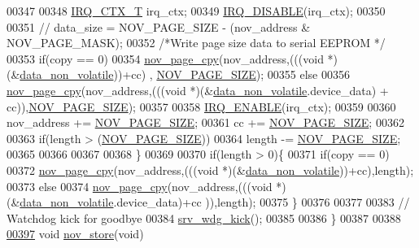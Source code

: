 \begin{DoxyCode}
00347 
00348         \hyperlink{a00033_a6d4f0a7397640f5b011ca9c39d47dc72}{IRQ\_CTX\_T}         irq\_ctx;
00349         \hyperlink{a00033_a357168bbe78739811cdb7b5576714ca6}{IRQ\_DISABLE}(irq\_ctx);
00350                             
00351        \textcolor{comment}{// data\_size = NOV\_PAGE\_SIZE - (nov\_address & NOV\_PAGE\_MASK);}
00352         \textcolor{comment}{/*Write page size data to serial EEPROM  */}
00353         \textcolor{keywordflow}{if}(copy == 0)
00354         \hyperlink{a00060_aeb021b0e002db120ad733c24f3e179bc}{nov\_page\_cpy}(nov\_address,(((\textcolor{keywordtype}{void} *)(&\hyperlink{a00060_a76ac5f917f5308dcd83de0d7c94559fb}{data\_non\_volatile}))+cc) ,
      \hyperlink{a00029_aad44ced0f63ecf5d2ced5bc0bf220287}{NOV\_PAGE\_SIZE});
00355         \textcolor{keywordflow}{else}
00356         \hyperlink{a00060_aeb021b0e002db120ad733c24f3e179bc}{nov\_page\_cpy}(nov\_address,(((\textcolor{keywordtype}{void} *)(&\hyperlink{a00060_a76ac5f917f5308dcd83de0d7c94559fb}{data\_non\_volatile}.device\_data) + 
      cc)),\hyperlink{a00029_aad44ced0f63ecf5d2ced5bc0bf220287}{NOV\_PAGE\_SIZE});
00357 
00358         \hyperlink{a00033_abc8e0f43382f8b0fdf60d35a93c20c57}{IRQ\_ENABLE}(irq\_ctx);
00359 
00360         nov\_address += \hyperlink{a00029_aad44ced0f63ecf5d2ced5bc0bf220287}{NOV\_PAGE\_SIZE};
00361         cc          += \hyperlink{a00029_aad44ced0f63ecf5d2ced5bc0bf220287}{NOV\_PAGE\_SIZE};
00362 
00363         \textcolor{keywordflow}{if}(length > (\hyperlink{a00029_aad44ced0f63ecf5d2ced5bc0bf220287}{NOV\_PAGE\_SIZE}))
00364         length      -= \hyperlink{a00029_aad44ced0f63ecf5d2ced5bc0bf220287}{NOV\_PAGE\_SIZE};
00365       
00366         
00367         
00368     \}
00369 
00370       \textcolor{keywordflow}{if}(length > 0)\{
00371        \textcolor{keywordflow}{if}(copy == 0)
00372         \hyperlink{a00060_aeb021b0e002db120ad733c24f3e179bc}{nov\_page\_cpy}(nov\_address,(((\textcolor{keywordtype}{void} *)(&\hyperlink{a00060_a76ac5f917f5308dcd83de0d7c94559fb}{data\_non\_volatile}))+cc),length);
00373         \textcolor{keywordflow}{else}
00374         \hyperlink{a00060_aeb021b0e002db120ad733c24f3e179bc}{nov\_page\_cpy}(nov\_address,(((\textcolor{keywordtype}{void} *)(&\hyperlink{a00060_a76ac5f917f5308dcd83de0d7c94559fb}{data\_non\_volatile}.device\_data)+cc
      )),length);
00375       \}
00376 
00377 
00383     \textcolor{comment}{// Watchdog kick for goodbye}
00384     \hyperlink{a00067_a710d148845397582739d170341f3d3d9}{srv\_wdg\_kick}();
00385 
00386 \}
00387 
00388 
\hypertarget{a00060_source_l00397}{}\hyperlink{a00060_a90aef186f45a15d94bf0247122194991}{00397} \textcolor{keywordtype}{void} \hyperlink{a00060_a90aef186f45a15d94bf0247122194991}{nov\_store}(\textcolor{keywordtype}{void})

\end{DoxyCode}
